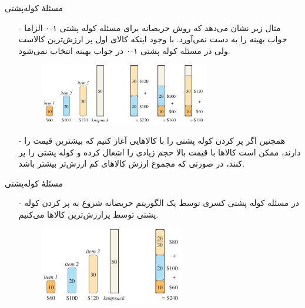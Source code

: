 \begin{frame}{مسئلهٔ کوله‌پشتی}
\begin{itemize}\itemr
\item[-]
مثال زیر نشان می‌دهد که روش حریصانه برای مسئله کوله پشتی ۱-۰ الزاما جواب بهینه را به دست نمی‌آورد. با وجود اینکه کالای اول پر ارزش‌ترین کالاست ولی در مسئله کوله پشتی ۱-۰ در جواب بهینه انتخاب نمی‌شود.
 \begin{figure}
\includegraphics[width=0.7\textwidth]{figs/chap05/knapsack-example}
 \end{figure}
\item[-]
همچنین اگر پر کردن کوله پشتی را با کالاهایی آغاز کنیم که بیشترین قیمت را دارند،
ممکن است کالاها با قیمت بالا حجم زیادی را اشغال کرده و کوله پشتی را پر کنند، در صورتی که مجموع ارزش کالاهای کم ارزش‌تر بیشتر باشد.
\end{itemize}
 \end{frame}


\begin{frame}{مسئلهٔ کوله‌پشتی}
\begin{itemize}\itemr
\item[-]
در مسئله کوله پشتی کسری توسط یک الگوریتم حریصانه شروع به پر کردن کوله پشتی توسط پرارزش‌ترین کالاها می‌کنیم.
\begin{figure}
\includegraphics[width=0.6\textwidth]{figs/chap05/knapsack-greedy}
\end{figure}
\end{itemize}
\end{frame}


